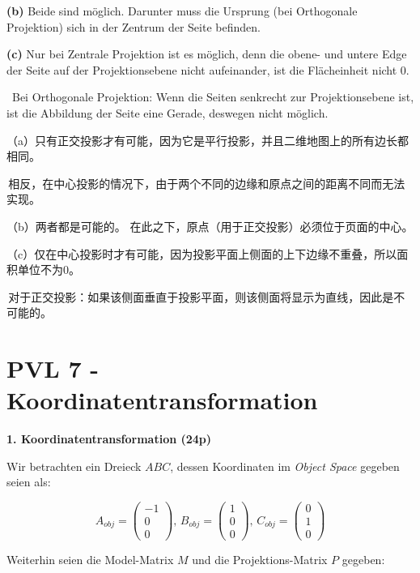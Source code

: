 \documentclass[fleqn]{article}
\begin{document}
\indent\indent\textbf{(b)} Beide sind möglich. Darunter muss die Ursprung (bei Orthogonale Projektion) sich in der Zentrum der Seite befinden.

\indent\indent\textbf{(c)} Nur bei Zentrale Projektion ist es möglich, denn die obene- und untere Edge der Seite auf der Projektionsebene nicht aufeinander, ist die Flächeinheit nicht 0.

\indent\indent\, Bei Orthogonale Projektion: Wenn die Seiten senkrecht zur Projektionsebene ist, ist die Abbildung der Seite eine Gerade, deswegen nicht möglich.

（a）只有正交投影才有可能，因为它是平行投影，并且二维地图上的所有边长都相同。

\indent\indent\,相反，在中心投影的情况下，由于两个不同的边缘和原点之间的距离不同而无法实现。

（b）两者都是可能的。 在此之下，原点（用于正交投影）必须位于页面的中心。

（c）仅在中心投影时才有可能，因为投影平面上侧面的上下边缘不重叠，所以面积单位不为0。

\indent\indent\,对于正交投影：如果该侧面垂直于投影平面，则该侧面将显示为直线，因此是不可能的。



\newpage

\section{PVL 7 - Koordinatentransformation}

\noindent\textbf{1. Koordinatentransformation (24p)}

Wir betrachten ein Dreieck $ABC$, dessen Koordinaten im \textit{Object Space} gegeben seien als:

$$A_{obj}=\begin{pmatrix}
    -1\\0\\0
\end{pmatrix},\,B_{obj}=\begin{pmatrix}
    1\\0\\0
\end{pmatrix},\,C_{obj}=\begin{pmatrix}
    0\\1\\0
\end{pmatrix}$$

Weiterhin seien die Model-Matrix $M$ und die Projektions-Matrix $P$ gegeben:
\end{document}
